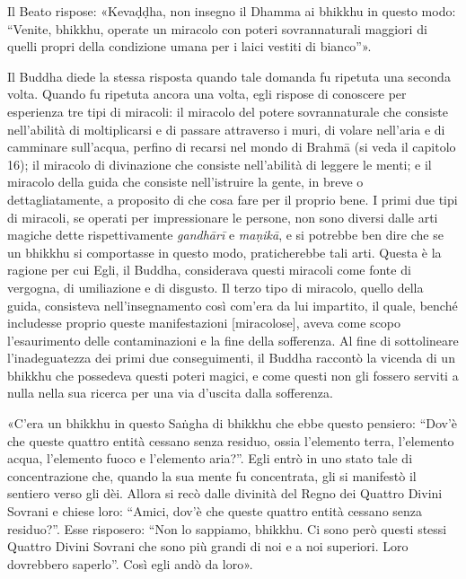 Il Beato rispose: «Kevaḍḍha, non insegno il Dhamma ai bhikkhu in questo
modo: “Venite, bhikkhu, operate un miracolo con poteri sovrannaturali
maggiori di quelli propri della condizione umana per i laici vestiti di
bianco”».


 Il Buddha diede la stessa risposta quando tale
domanda fu ripetuta una seconda volta. Quando fu ripetuta ancora una
volta, egli rispose di conoscere per esperienza tre tipi di miracoli: il
miracolo del potere sovrannaturale che consiste nell’abilità di
moltiplicarsi e di passare attraverso i muri, di volare nell’aria e di
camminare sull’acqua, perfino di recarsi nel mondo di Brahmā (si veda il
capitolo 16); il miracolo di divinazione che consiste nell’abilità di
leggere le menti; e il miracolo della guida che consiste nell’istruire
la gente, in breve o dettagliatamente, a proposito di che cosa fare per
il proprio bene. I primi due tipi di miracoli, se operati per
impressionare le persone, non sono diversi dalle arti magiche
dette rispettivamente \emph{gandhārī} e \emph{maṇikā}, e si potrebbe ben dire che
se un bhikkhu si comportasse in questo modo, praticherebbe tali arti.
Questa è la ragione per cui Egli, il Buddha, considerava questi miracoli
come fonte di vergogna, di umiliazione e di disgusto. Il terzo tipo di
miracolo, quello della guida, consisteva nell’insegnamento così com’era
da lui impartito, il quale, benché includesse proprio queste
manifestazioni [miracolose], aveva come scopo l’esaurimento delle
contaminazioni e la fine della sofferenza. Al fine di sottolineare
l’inadeguatezza dei primi due conseguimenti, il Buddha raccontò la
vicenda di un bhikkhu che possedeva questi poteri magici, e come questi
non gli fossero serviti a nulla nella sua ricerca per una via d’uscita
dalla sofferenza.


 «C’era un bhikkhu in questo Saṅgha di bhikkhu che ebbe
questo pensiero: “Dov’è che queste quattro entità cessano senza residuo,
ossia l’elemento terra, l’elemento acqua, l’elemento fuoco e l’elemento
aria?”. Egli entrò in uno stato tale di concentrazione che, quando la
sua mente fu concentrata, gli si manifestò il sentiero verso gli dèi.
Allora si recò dalle divinità del Regno dei Quattro Divini Sovrani e
chiese loro: “Amici, dov’è che queste quattro entità cessano senza
residuo?”. Esse risposero: “Non lo sappiamo, bhikkhu. Ci sono però
questi stessi Quattro Divini Sovrani che sono più grandi di noi e a noi
superiori. Loro dovrebbero saperlo”. Così egli andò da loro».


